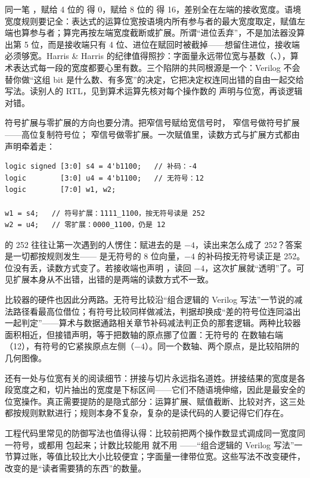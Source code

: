 同一笔 ，赋给 4 位的  得 0，赋给 8 位的  得 16，差别全在左端的接收宽度。语境宽度规则要记全：表达式的运算位宽按语境内所有参与者的最大宽度取定，赋值左端也算参与者；算完再按左端宽度截断或扩展。所谓“进位丢弃”，不是加法器没算出第 5 位，而是接收端只有 4 位、进位在赋回时被截掉——想留住进位，接收端必须够宽。Harris \& Harris 的纪律值得照抄：字面量永远带位宽与基数（、），算术表达式每一段的宽度都要心里有数。三个陷阱的共同根源是一个：Verilog 不会替你做“这组 bit 是什么数、有多宽”的决定，它把决定权连同出错的自由一起交给写法。读别人的 RTL，见到算术运算先核对每个操作数的  声明与位宽，再谈逻辑对错。

符号扩展与零扩展的方向也要分清。把窄信号赋给宽信号时， 窄信号做符号扩展——高位复制符号位； 窄信号做零扩展。一次赋值里，读数方式与扩展方式都由声明牵着走：

\begin{lstlisting}
logic signed [3:0] s4 = 4'b1100;   // 补码：-4
logic        [3:0] u4 = 4'b1100;   // 无符号：12
logic        [7:0] w1, w2;

w1 = s4;   // 符号扩展：1111_1100，按无符号读是 252
w2 = u4;   // 零扩展：0000_1100，仍是 12
\end{lstlisting}

 的 252 往往让第一次遇到的人愣住：赋进去的是 $-4$，读出来怎么成了 252？答案是一切都按规则发生—— 是无符号的 8 位向量，$-4$ 的补码按无符号读正是 252。位没有丢，读数方式变了。若接收端也声明 ，读回 $-4$，这次扩展就“透明”了。可见扩展本身从不出错，出错的是两端的读数方式不一致。

比较器的硬件也因此分两路。无符号比较沿“组合逻辑的 Verilog 写法”一节说的减法路径看最高位借位；有符号比较同样做减法，判据却换成“差的符号位连同溢出一起判定”——算术与数据通路相关章节补码减法判正负的那套逻辑。两种比较器面积相近，但接错声明，等于把数轴的原点挪了位置：无符号的  在数轴右端（12），有符号的它紧挨原点左侧（$-4$）。同一个数轴、两个原点，是比较陷阱的几何图像。

还有一处与位宽有关的阅读细节：拼接与切片永远指名道姓。拼接结果的宽度是各段宽度之和，切片抽出的宽度是下标区间——它们不随语境伸缩，因此是最安全的位宽操作。真正需要提防的是隐式部分：运算扩展、赋值截断、比较对齐，这三处都按规则默默进行；规则本身不复杂，复杂的是读代码的人要记得它们存在。

工程代码里常见的防御写法也值得认得：比较前把两个操作数显式调成同一宽度同一符号，或都用  包起来；计数比较能用 \code{==} 就不用 \code{>=}——“组合逻辑的 Verilog 写法”一节算过账，等值比较比大小比较便宜；字面量一律带位宽。这些写法不改变硬件，改变的是“读者需要猜的东西”的数量。

